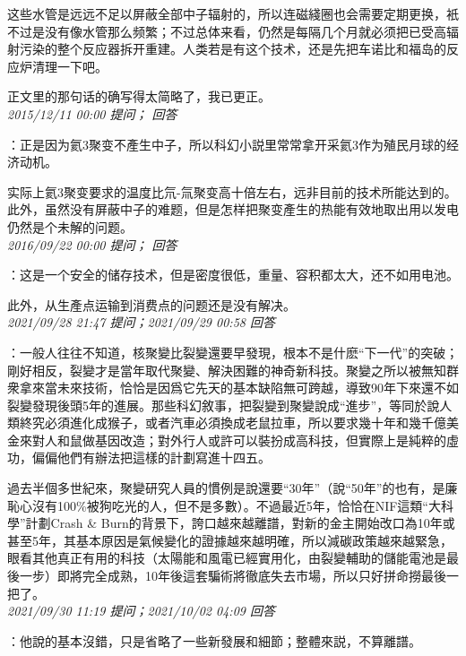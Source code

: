 \documentclass[twocolumn]{ctexart}
\begin{document}
这些水管是远远不足以屏蔽全部中子辐射的，所以连磁綫圈也会需要定期更换，衹不过是没有像水管那么频繁；不过总体来看，仍然是每隔几个月就必须把已受高辐射污染的整个反应器拆开重建。人类若是有这个技术，还是先把车诺比和福岛的反应炉清理一下吧。

正文里的那句话的确写得太简略了，我已更正。\\

\textit{\hfill\noindent\small 2015/12/11 00:00 提问； 回答}

：正是因为氦3聚变不產生中子，所以科幻小説里常常拿开采氦3作为殖民月球的经济动机。

实际上氦3聚变要求的温度比氘-氚聚变高十倍左右，远非目前的技术所能达到的。此外，虽然没有屏蔽中子的难题，但是怎样把聚变產生的热能有效地取出用以发电仍然是个未解的问题。\\

\textit{\hfill\noindent\small 2016/09/22 00:00 提问； 回答}

：这是一个安全的储存技术，但是密度很低，重量、容积都太大，还不如用电池。

此外，从生產点运输到消费点的问题还是没有解决。\\

\textit{\hfill\noindent\small 2021/09/28 21:47 提问；2021/09/29 00:58 回答}

：一般人往往不知道，核聚變比裂變還要早發現，根本不是什麽“下一代”的突破；剛好相反，裂變才是當年取代聚變、解決困難的神奇新科技。聚變之所以被無知群衆拿來當未來技術，恰恰是因爲它先天的基本缺陷無可跨越，導致90年下來還不如裂變發現後頭5年的進展。那些科幻敘事，把裂變到聚變說成“進步”，等同於說人類終究必須進化成猴子，或者汽車必須換成老鼠拉車，所以要求幾十年和幾千億美金來對人和鼠做基因改造；對外行人或許可以裝扮成高科技，但實際上是純粹的虛功，偏偏他們有辦法把這樣的計劃寫進十四五。

過去半個多世紀來，聚變研究人員的慣例是說還要“30年”（說“50年”的也有，是廉恥心沒有100\%被狗吃光的人，但不是多數）。不過最近5年，恰恰在NIF這類“大科學”計劃Crash \& Burn的背景下，誇口越來越離譜，對新的金主開始改口為10年或甚至5年，其基本原因是氣候變化的證據越來越明確，所以減碳政策越來越緊急，眼看其他真正有用的科技（太陽能和風電已經實用化，由裂變輔助的儲能電池是最後一步）即將完全成熟，10年後這套騙術將徹底失去市場，所以只好拼命撈最後一把了。
\\

\textit{\hfill\noindent\small 2021/09/30 11:19 提问；2021/10/02 04:09 回答}

：他說的基本沒錯，只是省略了一些新發展和細節；整體來説，不算離譜。
\end{document}
